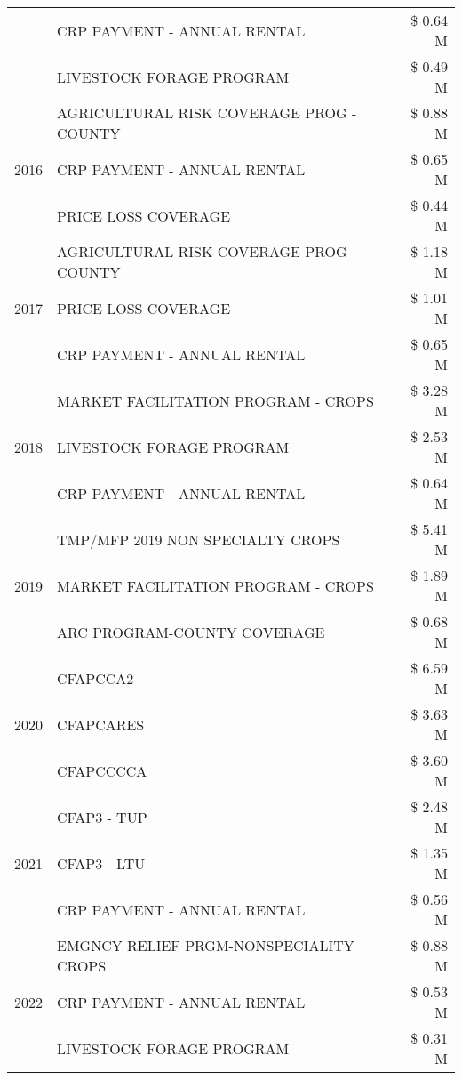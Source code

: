 \begin{tabular}{llr}
 & CRP PAYMENT - ANNUAL RENTAL & \$ 0.64 M \\
 & LIVESTOCK FORAGE PROGRAM & \$ 0.49 M \\
\cline{1-3}
\multirow[t]{3}{*}{2016} & AGRICULTURAL RISK COVERAGE PROG - COUNTY & \$ 0.88 M \\
 & CRP PAYMENT - ANNUAL RENTAL & \$ 0.65 M \\
 & PRICE LOSS COVERAGE & \$ 0.44 M \\
\cline{1-3}
\multirow[t]{3}{*}{2017} & AGRICULTURAL RISK COVERAGE PROG - COUNTY & \$ 1.18 M \\
 & PRICE LOSS COVERAGE & \$ 1.01 M \\
 & CRP PAYMENT - ANNUAL RENTAL & \$ 0.65 M \\
\cline{1-3}
\multirow[t]{3}{*}{2018} & MARKET FACILITATION PROGRAM - CROPS & \$ 3.28 M \\
 & LIVESTOCK FORAGE PROGRAM & \$ 2.53 M \\
 & CRP PAYMENT - ANNUAL RENTAL & \$ 0.64 M \\
\cline{1-3}
\multirow[t]{3}{*}{2019} & TMP/MFP 2019 NON SPECIALTY CROPS & \$ 5.41 M \\
 & MARKET FACILITATION PROGRAM - CROPS & \$ 1.89 M \\
 & ARC PROGRAM-COUNTY COVERAGE & \$ 0.68 M \\
\cline{1-3}
\multirow[t]{3}{*}{2020} & CFAPCCA2 & \$ 6.59 M \\
 & CFAPCARES & \$ 3.63 M \\
 & CFAPCCCCA & \$ 3.60 M \\
\cline{1-3}
\multirow[t]{3}{*}{2021} & CFAP3 - TUP & \$ 2.48 M \\
 & CFAP3 - LTU & \$ 1.35 M \\
 & CRP PAYMENT - ANNUAL RENTAL & \$ 0.56 M \\
\cline{1-3}
\multirow[t]{3}{*}{2022} & EMGNCY RELIEF PRGM-NONSPECIALITY CROPS & \$ 0.88 M \\
 & CRP PAYMENT - ANNUAL RENTAL & \$ 0.53 M \\
 & LIVESTOCK FORAGE PROGRAM & \$ 0.31 M \\
\cline{1-3}
\bottomrule
\end{tabular}
